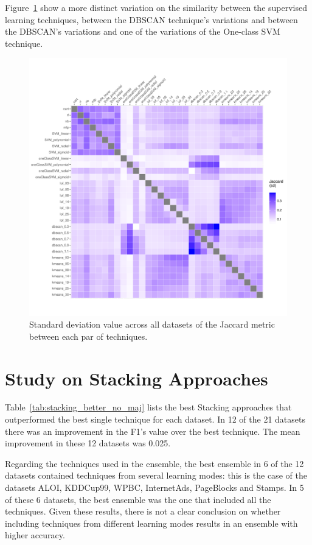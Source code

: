 Figure~\ref{fig:sd} show a more distinct variation on the similarity between the supervised learning techniques, between the DBSCAN technique's variations and between the DBSCAN's variations and one of the variations of the One-class SVM technique.

\begin{figure}[ht!]
	\centering
	\includegraphics[width=\textwidth]{figures/plot_sd.pdf}
	\caption{Standard deviation value across all datasets of the Jaccard metric between each par of techniques.}
	\label{fig:sd}
\end{figure}

\section{Study on Stacking Approaches}

Table~\ref{tab:stacking_better_no_maj} lists the best Stacking approaches that outperformed the best single technique for each dataset.
In 12 of the 21 datasets there was an improvement in the F1's value over the best technique. The mean improvement in these 12 datasets was 0.025.

Regarding the techniques used in the ensemble, the best ensemble in 6 of the 12 datasets contained techniques from several learning modes: this is the case of the datasets ALOI, KDDCup99, WPBC, InternetAds, PageBlocks and Stamps.
In 5 of these 6 datasets, the best ensemble was the one that included all the techniques.
Given these results, there is not a clear conclusion on whether including techniques from different learning modes results in an ensemble with higher accuracy.

